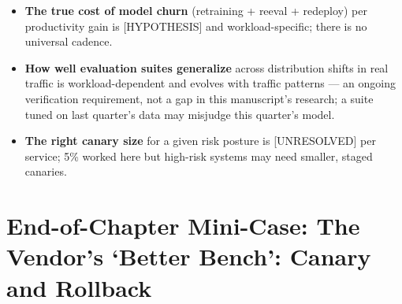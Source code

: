 \label{what-we-still-dont-know}


\begin{itemize}
\tightlist
\item
  \textbf{The true cost of model churn} (retraining + reeval + redeploy)
  per productivity gain is \mbox{{[}HYPOTHESIS{]}} and workload-specific; there
  is no universal cadence.
\item
  \textbf{How well evaluation suites generalize} across distribution
  shifts in real traffic is workload-dependent and evolves with traffic
  patterns --- an ongoing verification requirement, not a gap in this
  manuscript's research; a suite tuned on last quarter's data may
  misjudge this quarter's model.
\item
  \textbf{The right canary size} for a given risk posture is
  \mbox{{[}UNRESOLVED{]}} per service; 5\% worked here but high-risk systems
  may need smaller, staged canaries.
\end{itemize}

\section{End-of-Chapter Mini-Case: The Vendor's `Better Bench': Canary
and
Rollback}\label{end-of-chapter-mini-case-the-vendors-better-bench-canary-and-rollback}

